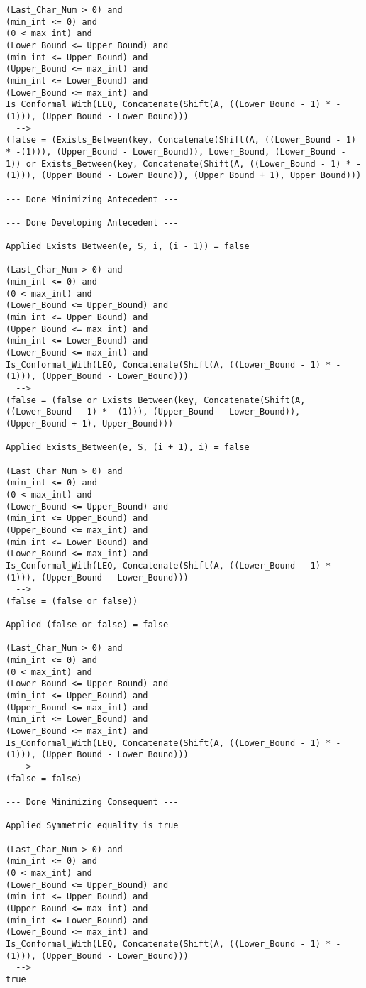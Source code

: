 \begin{lstlisting}[language=resolve]
(Last_Char_Num > 0) and
(min_int <= 0) and
(0 < max_int) and
(Lower_Bound <= Upper_Bound) and
(min_int <= Upper_Bound) and
(Upper_Bound <= max_int) and
(min_int <= Lower_Bound) and
(Lower_Bound <= max_int) and
Is_Conformal_With(LEQ, Concatenate(Shift(A, ((Lower_Bound - 1) * -(1))), (Upper_Bound - Lower_Bound)))
  -->
(false = (Exists_Between(key, Concatenate(Shift(A, ((Lower_Bound - 1) * -(1))), (Upper_Bound - Lower_Bound)), Lower_Bound, (Lower_Bound - 1)) or Exists_Between(key, Concatenate(Shift(A, ((Lower_Bound - 1) * -(1))), (Upper_Bound - Lower_Bound)), (Upper_Bound + 1), Upper_Bound)))

--- Done Minimizing Antecedent ---

--- Done Developing Antecedent ---

Applied Exists_Between(e, S, i, (i - 1)) = false

(Last_Char_Num > 0) and
(min_int <= 0) and
(0 < max_int) and
(Lower_Bound <= Upper_Bound) and
(min_int <= Upper_Bound) and
(Upper_Bound <= max_int) and
(min_int <= Lower_Bound) and
(Lower_Bound <= max_int) and
Is_Conformal_With(LEQ, Concatenate(Shift(A, ((Lower_Bound - 1) * -(1))), (Upper_Bound - Lower_Bound)))
  -->
(false = (false or Exists_Between(key, Concatenate(Shift(A, ((Lower_Bound - 1) * -(1))), (Upper_Bound - Lower_Bound)), (Upper_Bound + 1), Upper_Bound)))

Applied Exists_Between(e, S, (i + 1), i) = false

(Last_Char_Num > 0) and
(min_int <= 0) and
(0 < max_int) and
(Lower_Bound <= Upper_Bound) and
(min_int <= Upper_Bound) and
(Upper_Bound <= max_int) and
(min_int <= Lower_Bound) and
(Lower_Bound <= max_int) and
Is_Conformal_With(LEQ, Concatenate(Shift(A, ((Lower_Bound - 1) * -(1))), (Upper_Bound - Lower_Bound)))
  -->
(false = (false or false))

Applied (false or false) = false

(Last_Char_Num > 0) and
(min_int <= 0) and
(0 < max_int) and
(Lower_Bound <= Upper_Bound) and
(min_int <= Upper_Bound) and
(Upper_Bound <= max_int) and
(min_int <= Lower_Bound) and
(Lower_Bound <= max_int) and
Is_Conformal_With(LEQ, Concatenate(Shift(A, ((Lower_Bound - 1) * -(1))), (Upper_Bound - Lower_Bound)))
  -->
(false = false)

--- Done Minimizing Consequent ---

Applied Symmetric equality is true

(Last_Char_Num > 0) and
(min_int <= 0) and
(0 < max_int) and
(Lower_Bound <= Upper_Bound) and
(min_int <= Upper_Bound) and
(Upper_Bound <= max_int) and
(min_int <= Lower_Bound) and
(Lower_Bound <= max_int) and
Is_Conformal_With(LEQ, Concatenate(Shift(A, ((Lower_Bound - 1) * -(1))), (Upper_Bound - Lower_Bound)))
  -->
true


\end{lstlisting}
